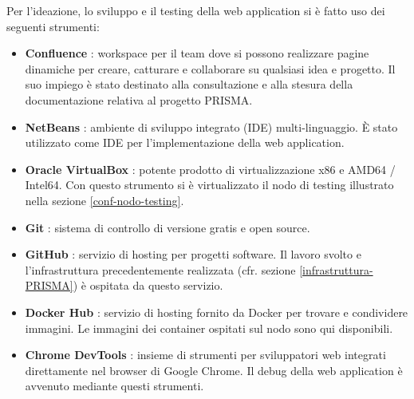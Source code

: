 Per l'ideazione, lo sviluppo e il testing della web application si è fatto uso dei seguenti strumenti:

\begin{itemize}
    
\item
\textbf{Confluence} \cite{confluence}: workspace per il team dove si possono realizzare pagine dinamiche per creare, catturare e collaborare su qualsiasi idea e progetto.
Il suo impiego è stato destinato alla consultazione e alla stesura della documentazione relativa al progetto PRISMA.

\item
\textbf{NetBeans} \cite{netbeans}: ambiente di sviluppo integrato (IDE) multi-linguaggio. 
È stato utilizzato come IDE per l'implementazione della web application.

\item
\textbf{Oracle VirtualBox} \cite{oracle-vbox}: potente prodotto di virtualizzazione x86 e AMD64 / Intel64.
Con questo strumento si è virtualizzato il nodo di testing illustrato nella sezione \ref{conf-nodo-testing}.

\item
\textbf{Git} \cite{git}: sistema di controllo di versione gratis e open source.

\item
\textbf{GitHub} \cite{github}: servizio di hosting per progetti software. Il lavoro svolto e l'infrastruttura precedentemente realizzata (cfr. sezione \ref{infrastruttura-PRISMA}) è ospitata da questo servizio.

\item
\textbf{Docker Hub} \cite{docker-hub}: servizio di hosting fornito da Docker per trovare e condividere immagini. Le immagini dei container ospitati sul nodo sono qui disponibili.

\item
\textbf{Chrome DevTools} \cite{chrome-devtools}: insieme di strumenti per sviluppatori web integrati direttamente nel browser di Google Chrome. 
Il debug della web application è avvenuto mediante questi strumenti.

\end{itemize}